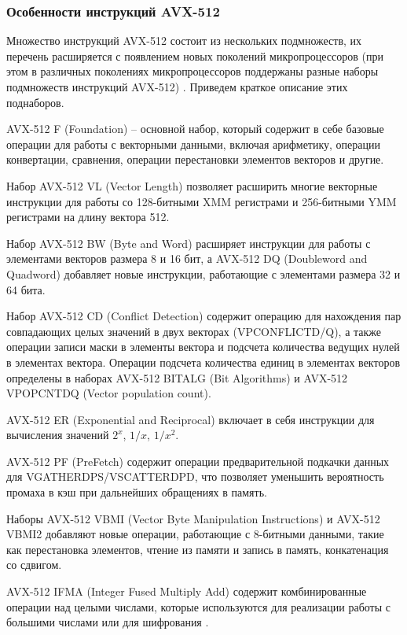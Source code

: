\subsubsection{Особенности инструкций AVX-512}

Множество инструкций AVX-512\label{abbr:avx-5} состоит из нескольких подмножеств, их перечень расширяется с появлением новых поколений микропроцессоров (при этом в различных поколениях микропроцессоров поддержаны разные наборы подмножеств инструкций AVX-512) \cite{IntelSDM2025}.
Приведем краткое описание этих поднаборов.

AVX-512 F (Foundation) -- основной набор, который содержит в себе базовые операции для работы с векторными данными, включая арифметику, операции конвертации, сравнения, операции перестановки элементов векторов и другие.

Набор AVX-512 VL\label{abbr:vl-1} (Vector Length) позволяет расширить многие векторные инструкции для работы со 128-битными XMM регистрами и 256-битными YMM регистрами на длину вектора 512.

Набор AVX-512 BW\label{abbr:bw-1} (Byte and Word) расширяет инструкции для работы с элементами векторов размера 8 и 16 бит, а AVX-512 DQ\label{abbr:dq-1} (Doubleword and Quadword) добавляет новые инструкции, работающие с элементами размера 32 и 64 бита.

Набор AVX-512 CD\label{abbr:cd-1} (Conflict Detection) содержит операцию для нахождения пар совпадающих целых значений в двух векторах (VPCONFLICTD/Q), а также операции записи маски в элементы вектора и подсчета количества ведущих нулей в элементах вектора.
Операции подсчета количества единиц в элементах векторов определены в наборах AVX-512 BITALG\label{abbr:bitalg-1} (Bit Algorithms) и AVX-512 VPOPCNTDQ (Vector population count).

AVX-512 ER\label{abbr:er-1} (Exponential and Reciprocal) включает в себя инструкции для вычисления значений $2^x$, $1/x$, $1/{x^2}$.

AVX-512 PF\label{abbr:pf-1} (PreFetch) содержит операции предварительной подкачки данных для VGATHERDPS/VSCATTERDPD, что позволяет уменьшить вероятность промаха в кэш при дальнейших обращениях в память.

Наборы AVX-512 VBMI\label{abbr:vbmi-1} (Vector Byte Manipulation Instructions) и AVX-512 VBMI2 добавляют новые операции, работающие с 8-битными данными, такие как перестановка элементов, чтение из памяти и запись в память, конкатенация со сдвигом.

AVX-512 IFMA\label{abbr:ifma-2} (Integer Fused Multiply Add) содержит комбинированные операции над целыми числами, которые используются для реализации работы с большими числами или для шифрования \cite{Edamatsu2023VecDiv}.

